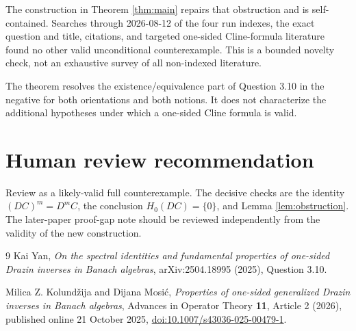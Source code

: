 \documentclass[11pt]{article}
\begin{document}
The construction in Theorem \ref{thm:main} repairs that obstruction and is
self-contained.  Searches through 2026-08-12 of the four run indexes, the
exact question and title, citations, and targeted one-sided Cline-formula
literature found no other valid unconditional counterexample.  This is a
bounded novelty check, not an exhaustive survey of all non-indexed
literature.

The theorem resolves the existence/equivalence part of Question 3.10 in the
negative for both orientations and both notions.  It does not characterize
the additional hypotheses under which a one-sided Cline formula is valid.

\section*{Human review recommendation}

\enlargethispage{4\baselineskip}
Review as a likely-valid full counterexample.  The decisive checks are the
identity $(DC)^m=D^mC$, the conclusion $H_0(DC)=\{0\}$, and Lemma
\ref{lem:obstruction}.  The later-paper proof-gap note should be reviewed
independently from the validity of the new construction.

\begin{thebibliography}{9}
Kai Yan,
\emph{On the spectral identities and fundamental properties of one-sided
Drazin inverses in Banach algebras}, arXiv:2504.18995 (2025), Question 3.10.

Milica Z. Kolund\v{z}ija and Dijana Mosi\'c,
\emph{Properties of one-sided generalized Drazin inverses in Banach
algebras}, Advances in Operator Theory \textbf{11}, Article 2 (2026),
published online 21 October 2025,
\href{https://doi.org/10.1007/s43036-025-00479-1}{doi:10.1007/s43036-025-00479-1}.
\end{thebibliography}
\end{document}
